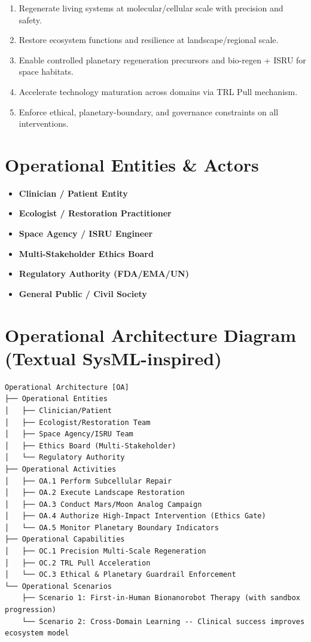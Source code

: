 \documentclass[11pt,a4paper]{report}
\begin{document}
\begin{enumerate}[label=OC-\arabic*]
    \item Regenerate living systems at molecular/cellular scale with precision and safety.
    \item Restore ecosystem functions and resilience at landscape/regional scale.
    \item Enable controlled planetary regeneration precursors and bio-regen + ISRU for space habitats.
    \item Accelerate technology maturation across domains via TRL Pull mechanism.
    \item Enforce ethical, planetary-boundary, and governance constraints on all interventions.
\end{enumerate}

\section{Operational Entities \& Actors}

\begin{itemize}
    \item \textbf{Clinician / Patient Entity}
    \item \textbf{Ecologist / Restoration Practitioner}
    \item \textbf{Space Agency / ISRU Engineer}
    \item \textbf{Multi-Stakeholder Ethics Board}
    \item \textbf{Regulatory Authority (FDA/EMA/UN)}
    \item \textbf{General Public / Civil Society}
\end{itemize}

\section{Operational Architecture Diagram (Textual SysML-inspired)}

\begin{lstlisting}[style=sysmlstyle, caption={Operational Architecture (OA) -- Textual Representation for Capella}]
Operational Architecture [OA]
├── Operational Entities
│   ├── Clinician/Patient
│   ├── Ecologist/Restoration Team
│   ├── Space Agency/ISRU Team
│   ├── Ethics Board (Multi-Stakeholder)
│   └── Regulatory Authority
├── Operational Activities
│   ├── OA.1 Perform Subcellular Repair
│   ├── OA.2 Execute Landscape Restoration
│   ├── OA.3 Conduct Mars/Moon Analog Campaign
│   ├── OA.4 Authorize High-Impact Intervention (Ethics Gate)
│   └── OA.5 Monitor Planetary Boundary Indicators
├── Operational Capabilities
│   ├── OC.1 Precision Multi-Scale Regeneration
│   ├── OC.2 TRL Pull Acceleration
│   └── OC.3 Ethical & Planetary Guardrail Enforcement
└── Operational Scenarios
    ├── Scenario 1: First-in-Human Bionanorobot Therapy (with sandbox progression)
    └── Scenario 2: Cross-Domain Learning -- Clinical success improves ecosystem model
\end{lstlisting}
\end{document}
